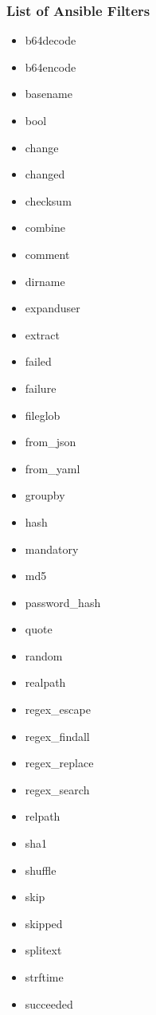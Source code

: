 \documentclass[pdf]{beamer}
\begin{document}
\begin{frame}
  \frametitle{List of Ansible Filters}
  \tiny
  \setlength{\columnseprule}{0mm}
  \setlength{\columnsep}{0mm}
  \begin{multicols*}{5}
    \begin{itemize}
      \item[] b64decode
      \item[] b64encode
      \item[] basename
      \item[] bool
      \item[] change
      \item[] changed
      \item[] checksum
      \item[] combine
      \item[] comment
      \item[] dirname
      \item[] expanduser
      \item[] extract
      \item[] failed
      \item[] failure
      \item[] fileglob
      \item[] from\_json
      \item[] from\_yaml
      \item[] groupby
      \item[] hash
      \item[] mandatory
      \item[] md5
      \item[] password\_hash
      \item[] quote
      \item[] random
      \item[] realpath
      \item[] regex\_escape
      \item[] regex\_findall
      \item[] regex\_replace
      \item[] regex\_search
      \item[] relpath
      \item[] sha1
      \item[] shuffle
      \item[] skip
      \item[] skipped
      \item[] splitext
      \item[] strftime
      \item[] succeeded

\end{itemize}
\end{multicols*}
\end{frame}
\end{document}
